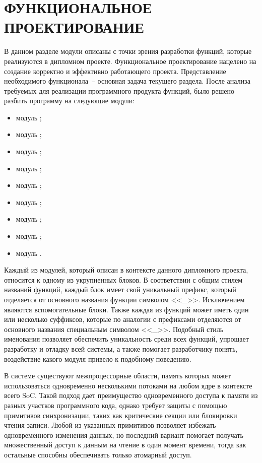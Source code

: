\section{ФУНКЦИОНАЛЬНОЕ ПРОЕКТИРОВАНИЕ}
\label{sec:func}

В данном разделе модули описаны с точки зрения разработки функций, которые реализуются в
дипломном проекте. Функциональное проектирование нацелено на создание корректно и
эффективно работающего проекта. Представление необходимого функционала~-- основная задача
текущего раздела. После анализа требуемых для реализации программного продукта
функций, было решено разбить программу на следующие модули:

\begin{itemize}
    \item модуль \moduleCfg;
    \item модуль \moduleXml;
    \item модуль \moduleSettingsApply;
    \item модуль \moduleRecvPackets;
    \item модуль \moduleThreads;
    \item модуль \moduleProcessPackets;
    \item модуль \moduleDataStoring;
    \item модуль \moduleOsal;
    \item модуль \moduleLog.
\end{itemize}

Каждый из модулей, который описан в контексте данного дипломного проекта,
относится к одному из укрупненных блоков. В соответствии с общим стилем
названий функций, каждый блок имеет свой уникальный префикс, который
отделяется от основного названия функции символом <<\_>>.
Исключением являются вспомогательные блоки.
Также каждая из функций может иметь один или несколько суффиксов,
которые по аналогии с префиксами отделяются от основного
названия специальным символом <<\_>>.
Подобный стиль именования позволяет обеспечить уникальность среди всех функций,
упрощает разработку и отладку всей системы, а также помогает разработчику
понять, воздействие какого модуля привело к подобному поведению.

В системе существуют межпроцессорные области, память которых может использоваться одновременно несколькими потоками на любом ядре в контексте всего SoC.
Такой подход дает преимущество одновременного доступа к памяти из разных участков программного кода, однако требует защиты с
помощью примитивов синхронизации, таких как критические секции или блокировки
чтения-записи.
Любой из указанных примитивов позволяет избежать одновременного изменения данных,
но последний вариант помогает получать множественный доступ к данным на чтение
в один момент времени, тогда как остальные способны обеспечивать только атомарный доступ.

